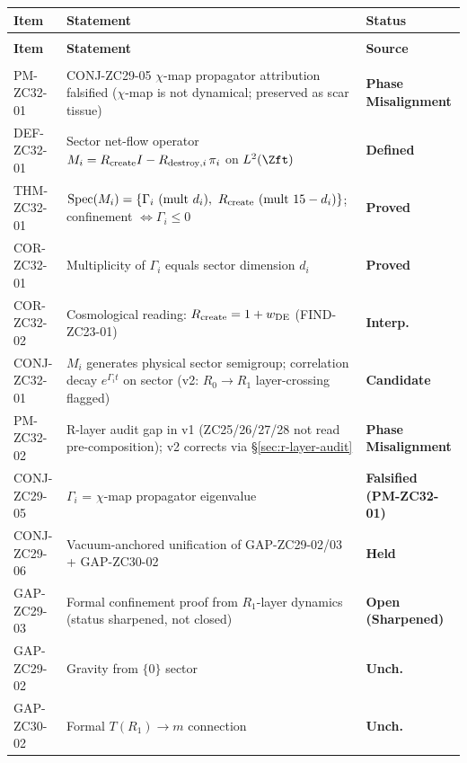 \documentclass[12pt, a4paper]{article}
\begin{document}
{\small
\setlength{\LTpre}{4pt}
\setlength{\LTpost}{4pt}
\renewcommand{\arraystretch}{1.30}
\begin{longtable}{>{\raggedright\arraybackslash}p{2.7cm}
                  >{\raggedright\arraybackslash}p{7.6cm}
                  >{\centering\arraybackslash}p{1.9cm}}
\toprule
\textbf{Item} & \textbf{Statement} & \textbf{Status}\\
\midrule
\endfirsthead
\multicolumn{3}{l}{\small\textit{(continued)}}\\[4pt]
\toprule
\textbf{Item} & \textbf{Statement} & \textbf{Source}\\
\midrule
\endhead
\midrule
\multicolumn{3}{r}{\small\textit{(continues)}}\\
\endfoot
\bottomrule
\endlastfoot
PM-ZC32-01    & CONJ-ZC29-05 $\chi$-map propagator attribution
  falsified ($\chi$-map is not dynamical;
  preserved as scar tissue) & \textbf{Phase Misalignment}\\
DEF-ZC32-01   & Sector net-flow operator
  $M_i = R_{\rm create} I - R_{{\rm destroy},i}\,\pi_i$
  on $L^2(\Zft)$ & \textbf{Defined}\\
THM-ZC32-01   & $\mathrm{Spec}(M_i) = \{\Gamma_i\ (\mathrm{mult}\
  d_i),\ R_{\rm create}\ (\mathrm{mult}\ 15-d_i)\}$;
  confinement $\Leftrightarrow \Gamma_i \leq 0$
  & \textbf{Proved}\\
COR-ZC32-01   & Multiplicity of $\Gamma_i$ equals sector
  dimension $d_i$ & \textbf{Proved}\\
COR-ZC32-02   & Cosmological reading:
  $R_{\rm create} = 1+w_{\rm DE}$ (FIND-ZC23-01)
  & \textbf{Interp.}\\
CONJ-ZC32-01  & $M_i$ generates physical sector semigroup;
  correlation decay $e^{\Gamma_i t}$ on sector
  (v2: $R_0 \to R_1$ layer-crossing flagged)
  & \textbf{Candidate}\\
PM-ZC32-02    & R-layer audit gap in v1 (ZC25/26/27/28 not
  read pre-composition); v2 corrects via §\ref{sec:r-layer-audit}
  & \textbf{Phase Misalignment}\\
\midrule
CONJ-ZC29-05  & $\Gamma_i$ = $\chi$-map propagator eigenvalue
  & \textbf{Falsified (PM-ZC32-01)}\\
CONJ-ZC29-06  & Vacuum-anchored unification of
  GAP-ZC29-02/03 + GAP-ZC30-02 & \textbf{Held}\\
\midrule
GAP-ZC29-03   & Formal confinement proof from $R_1$-layer
  dynamics (status sharpened, not closed)
  & \textbf{Open (Sharpened)}\\
GAP-ZC29-02   & Gravity from $\{0\}$ sector & \textbf{Unch.}\\
GAP-ZC30-02   & Formal $T(R_1) \to m$ connection
  & \textbf{Unch.}\\
\end{longtable}
}
\vspace{-6pt}
\end{document}
